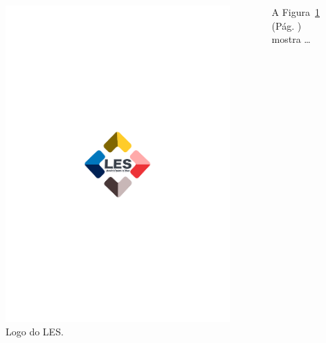 \begin{frame}[fragile]
{\begin{columns}
\begin{figure}
  \centering
  \includegraphics[scale=.3]{../img/les.pdf}
  \caption{Logo do LES.}
  \label{fig:les}
\end{figure}
A Figura~\ref{fig:les} 
(Pág. \pageref{fig:les})
 mostra \ldots
\end{columns}
}
\end{frame}

